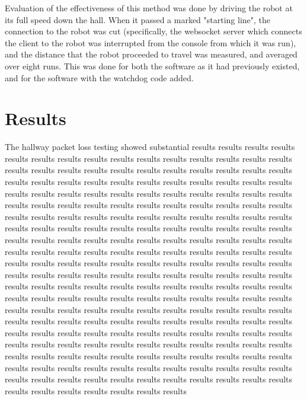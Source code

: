 \documentclass[letterpaper, 11pt]{article}
\begin{document}
Evaluation of the effectiveness of this method was done by driving the robot
at its full speed down the hall. When it passed a marked "starting line",
the connection to the robot was cut (specifically, the websocket server which
connects the client to the robot was interrupted from the console from which
it was run), and the distance that the robot proceeded to travel was measured, 
and averaged over eight runs. This was done for both the software as it had
previously existed, and for the software with the watchdog code added.

\section{Results}
The hallway packet loss testing showed substantial results 
results results results results results results results results results results
results results results results results results results results results results
results results results results results results results results results results
results results results results results results results results results results
results results results results results results results results results results
results results results results results results results results results results
results results results results results results results results results results
results results results results results results results results results results
results results results results results results results results results results
results results results results results results results results results results
results results results results results results results results results results
results results results results results results results results results results
results results results results results results results results results results
results results results results results results results results results results
results results results results results results results results results results
results results results results results results results results results results
results results results results results results results results results results
results results results results results results results results results results
results results results results results results results results results results
results results results results results results results results results results
results results results results results results results results results results
results results results results results results results results results results
results results results results results results results results results results
\end{document}
